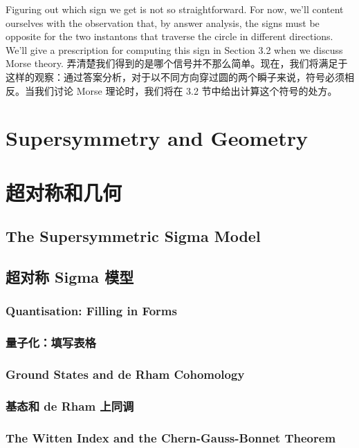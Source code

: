 \documentclass{article}
\begin{document}
\begin{paracol}{2}
Figuring out which sign we get is not so straightforward. For now, we’ll content ourselves with the observation that, by answer analysis, the signs must be opposite for the two instantons that traverse the circle in diﬀerent directions. We’ll give a prescription for computing this sign in Section 3.2 when we discuss Morse theory.
\switchcolumn
弄清楚我们得到的是哪个信号并不那么简单。现在，我们将满足于这样的观察：通过答案分析，对于以不同方向穿过圆的两个瞬子来说，符号必须相反。当我们讨论 Morse 理论时，我们将在 3.2 节中给出计算这个符号的处方。
\switchcolumn*

\section{Supersymmetry and Geometry}
\switchcolumn
\section*{超对称和几何}
\switchcolumn*

\subsection{The Supersymmetric Sigma Model}
\switchcolumn
\subsection*{超对称 Sigma 模型}
\switchcolumn*

\subsubsection{Quantisation: Filling in Forms}
\switchcolumn
\subsubsection*{量子化：填写表格}
\switchcolumn*

\subsubsection{Ground States and de Rham Cohomology}
\switchcolumn
\subsubsection*{基态和 de Rham 上同调}
\switchcolumn*

\subsubsection{The Witten Index and the Chern-Gauss-Bonnet Theorem}
\switchcolumn

\end{paracol}
\end{document}
